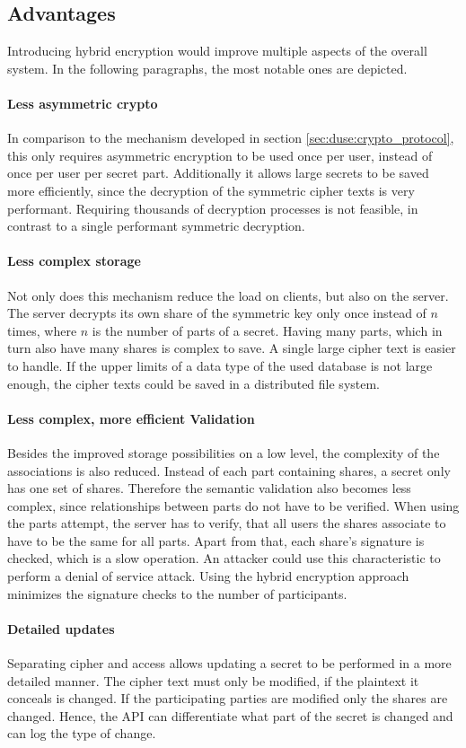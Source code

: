 \subsection{Advantages}

Introducing hybrid encryption would improve multiple aspects of the overall
system. In the following paragraphs, the most notable ones are depicted.

\paragraph{Less asymmetric crypto}{ In comparison to the mechanism developed in
  section \ref{sec:duse:crypto_protocol}, this only requires asymmetric encryption to
  be used once per user, instead of once per user per secret part. Additionally
  it allows large secrets to be saved more efficiently, since the decryption of
the symmetric cipher texts is very performant. Requiring thousands of
decryption processes is not feasible, in contrast to a single performant
symmetric decryption.}

\paragraph{Less complex storage}{ Not only does this mechanism reduce the load
  on clients, but also on the server. The server decrypts its own share of the
  symmetric key only once instead of $n$ times, where $n$ is the number of
  parts of a secret.  Having many parts, which in turn also have many shares is
complex to save. A single large cipher text is easier to handle. If the upper
limits of a data type of the used database is not large enough, the cipher
texts could be saved in a distributed file system.}

\paragraph{Less complex, more efficient Validation}{ Besides the improved
  storage possibilities on a low level, the complexity of the associations is
  also reduced. Instead of each part containing shares, a secret only has one
  set of shares.  Therefore the semantic validation also becomes less complex,
  since relationships between parts do not have to be verified. When using the
  parts attempt, the server has to verify, that all users the shares associate
  to have to be the same for all parts. Apart from that, each share's signature
  is checked, which is a slow operation. An attacker could use this
characteristic to perform a denial of service attack. Using the hybrid
encryption approach minimizes the signature checks to the number of
participants. }

\paragraph{Detailed updates}{ Separating cipher and access allows updating a
  secret to be performed in a more detailed manner. The cipher text must only
  be modified, if the plaintext it conceals is changed. If the participating
  parties are modified only the shares are changed. Hence, the API can
differentiate what part of the secret is changed and can log the type of
change. }
